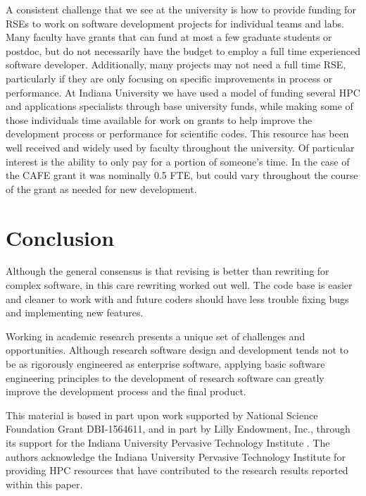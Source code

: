 \documentclass[acmtog, authorversion]{acmart}
\begin{document}
A consistent challenge that we see at the university is how to provide funding for RSEs to work on software development projects for individual teams and labs. Many faculty have grants that can fund at most a few graduate students or postdoc, but do not necessarily have the budget to employ a full time experienced software developer. Additionally, many projects may not need a full time RSE, particularly if they are only focusing on specific improvements in process or performance. At Indiana University we have used a model of funding several HPC and applications specialists through base university funds, while making some of those individuals time available for work on grants to help improve the development process or performance for scientific codes. This resource has been well received and widely used by faculty throughout the university. Of particular interest is the ability to only pay for a portion of someone's time. In the case of the CAFE grant it was nominally 0.5 FTE, but could vary throughout the course of the grant as needed for new development.
    
    

\section{Conclusion} \label{sec:conclude}

Although the general consensus is that revising is better than rewriting for complex software, in this care rewriting worked out well. The code base is easier and cleaner to work with and future coders should have less trouble fixing bugs and implementing new features.

Working in academic research presents a unique set of challenges and opportunities. Although research software design and development tends not to be as rigorously engineered as enterprise software, applying basic software engineering principles to the development of research software can greatly improve the development process and the final product.

\begin{acks}

This material is based in part upon work supported by National Science Foundation Grant DBI-1564611, and in part by Lilly Endowment, Inc., through its support for the Indiana University Pervasive Technology Institute \cite{stewart2017indiana}. The authors acknowledge the Indiana University Pervasive Technology Institute for providing HPC resources that have contributed to the research results reported within this paper.
\end{acks}




\appendix
\end{document}
